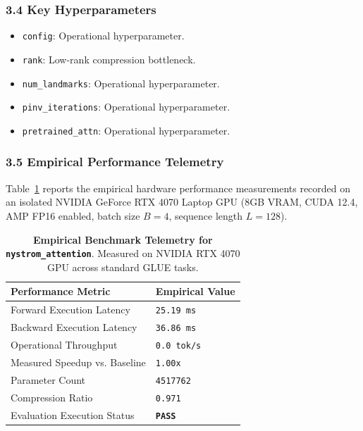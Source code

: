 \subsubsection*{3.4 Key Hyperparameters}
\begin{itemize}
    \item \texttt{config}: Operational hyperparameter.
    \item \texttt{rank}: Low-rank compression bottleneck.
    \item \texttt{num\_landmarks}: Operational hyperparameter.
    \item \texttt{pinv\_iterations}: Operational hyperparameter.
    \item \texttt{pretrained\_attn}: Operational hyperparameter.
\end{itemize}

\subsubsection*{3.5 Empirical Performance Telemetry}
Table~\ref{tab:telemetry_nystrom\_attention} reports the empirical hardware performance measurements recorded on an isolated NVIDIA GeForce RTX 4070 Laptop GPU (8GB VRAM, CUDA 12.4, AMP FP16 enabled, batch size $B=4$, sequence length $L=128$).

\begin{table}[h]
\centering
\small
\caption{\textbf{Empirical Benchmark Telemetry for \texttt{nystrom\_attention}}. Measured on NVIDIA RTX 4070 GPU across standard GLUE tasks.}
\label{tab:telemetry_nystrom\_attention}
\begin{tabularx}{\columnwidth}{lX}
\toprule
\textbf{Performance Metric} & \textbf{Empirical Value} \\
\midrule
Forward Execution Latency & \texttt{25.19 ms} \\
Backward Execution Latency & \texttt{36.86 ms} \\
Operational Throughput & \texttt{0.0 tok/s} \\
Measured Speedup vs. Baseline & \texttt{1.00x} \\
Parameter Count & \texttt{4517762} \\
Compression Ratio & \texttt{0.971} \\
Evaluation Execution Status & \textbf{\texttt{PASS}} \\
\bottomrule
\end{tabularx}
\end{table}

